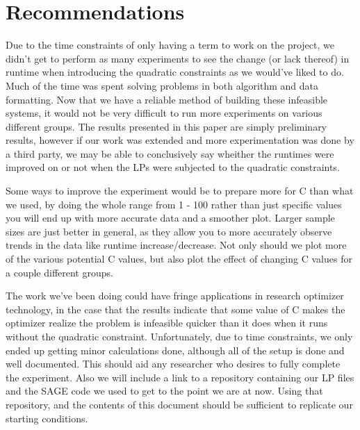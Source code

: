 \documentclass[11pt]{article} %
\theoremstyle{definition}
\theoremstyle{remark}
\begin{document}
\section{Recommendations}

Due to the time constraints of only having a term to work on the project, we didn't get to perform as many experiments to see the change (or lack thereof) in runtime when introducing the quadratic constraints as we would've liked to do. Much of the time was spent solving problems in both algorithm and data formatting. Now that we have a reliable method of building these infeasible systems, it would not be very difficult to run more experiments on various different groups. The results presented in this paper are simply preliminary results, however if our work was extended and more experimentation was done by a third party, we may be able to conclusively say wheither the runtimes were improved on or not when the LPs were subjected to the quadratic constraints.

Some ways to improve the experiment would be to prepare more for C than what we used, by doing the whole range from 1 - 100 rather than just specific values you will end up with more accurate data and a smoother plot. Larger sample sizes are just better in general, as they allow you to more accurately observe trends in the data like runtime increase/decrease.
Not only should we plot more of the various potential C values, but also plot the effect of changing C values for a couple different groups. 

The work we've been doing could have fringe applications in research optimizer technology, in the case that the results indicate that some value of C makes the optimizer realize the problem is infeasible quicker than it does when it runs without the quadratic constraint. Unfortunately, due to time constraints, we only ended up getting minor calculations done, although all of the setup is done and well documented. This should aid any researcher who desires to fully complete the experiment. Also we will include a link to a repository containing our LP files and the SAGE code we used to get to the point we are at now. Using that repository, and the contents of this document should be sufficient to replicate our starting conditions. 
\end{document}
